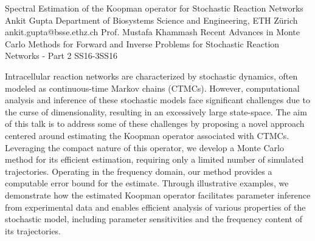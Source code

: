\begin{talk}
  {Spectral Estimation of the Koopman operator for Stochastic Reaction Networks}%
  {Ankit Gupta}%
  {Department of Biosystems Science and Engineering, ETH Z\"{u}rich}%
  {ankit.gupta@bsse.ethz.ch}%
  {Prof. Mustafa Khammash}%
{Recent Advances in Monte Carlo Methods for Forward and Inverse Problems for Stochastic Reaction Networks - Part 2}
{}{SS16-3}{SS16}

			
Intracellular reaction networks are characterized by stochastic dynamics, often modeled as continuous-time Markov chains (CTMCs). However, computational analysis and inference of these stochastic models face significant challenges due to the curse of dimensionality, resulting in an excessively large state-space. The aim of this talk is to address some of these challenges by proposing a novel approach centered around estimating the Koopman operator associated with CTMCs. Leveraging the compact nature of this operator, we develop a Monte Carlo method for its efficient estimation, requiring only a limited number of simulated trajectories. Operating in the frequency domain, our method provides a computable error bound for the estimate. Through illustrative examples, we demonstrate how the estimated Koopman operator facilitates parameter inference from experimental data and enables efficient analysis of various properties of the stochastic model, including parameter sensitivities and the frequency content of its trajectories.
\end{talk}

